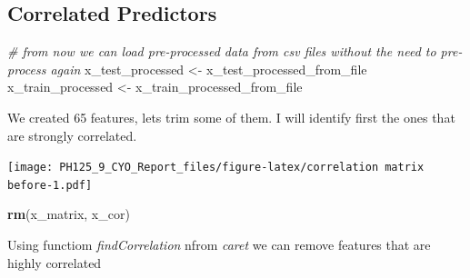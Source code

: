 \documentclass[]{article}
\newenvironment{Shaded}{\begin{snugshade}}{\end{snugshade}}
\newcommand{\CommentTok}[1]{\textcolor[rgb]{0.56,0.35,0.01}{\textit{#1}}}
\newcommand{\DataTypeTok}[1]{\textcolor[rgb]{0.13,0.29,0.53}{#1}}
\newcommand{\FloatTok}[1]{\textcolor[rgb]{0.00,0.00,0.81}{#1}}
\newcommand{\KeywordTok}[1]{\textcolor[rgb]{0.13,0.29,0.53}{\textbf{#1}}}
\newcommand{\NormalTok}[1]{#1}
\newcommand{\OperatorTok}[1]{\textcolor[rgb]{0.81,0.36,0.00}{\textbf{#1}}}
\newcommand{\StringTok}[1]{\textcolor[rgb]{0.31,0.60,0.02}{#1}}
\begin{document}
\hypertarget{correlated-predictors}{%
\subsection{Correlated Predictors}\label{correlated-predictors}}

\begin{Shaded}
\begin{Highlighting}[]
\CommentTok{# from now we can load pre-processed data from csv files without the need to pre-process again}
\NormalTok{x_test_processed <-}\StringTok{ }\NormalTok{x_test_processed_from_file}
\NormalTok{x_train_processed <-}\StringTok{ }\NormalTok{x_train_processed_from_file }
\end{Highlighting}
\end{Shaded}

We created 65 features, lets trim some of them. I will identify first
the ones that are strongly correlated.

\begin{Shaded}
\end{Shaded}

\texttt{[image: PH125\_9\_CYO\_Report\_files/figure-latex/correlation matrix before-1.pdf]}

\begin{Shaded}
\begin{Highlighting}[]
\KeywordTok{rm}\NormalTok{(x_matrix, x_cor)}
\end{Highlighting}
\end{Shaded}

Using functiom \emph{findCorrelation} nfrom \emph{caret} we can remove
features that are highly correlated
\end{document}
